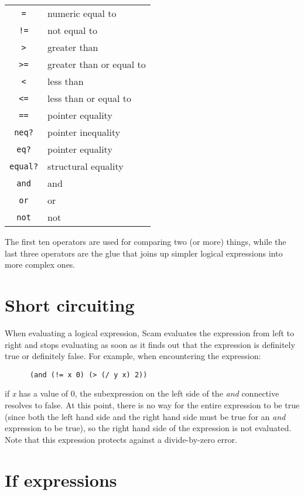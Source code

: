 \begin{tabular}{cl}%
    {\tt =}     & numeric equal to \\
    {\tt !=}    & not equal to \\
    {\tt >}     & greater than \\
    {\tt >=}    & greater than or equal to \\
    {\tt <}     & less than \\
    {\tt <=}    & less than or equal to \\
    {\tt ==}    & pointer equality \\
    {\tt neq?}  & pointer inequality \\
    {\tt eq?}   & pointer equality \\
    {\tt equal?}& structural equality \\
    {\tt and}   & and \\
    {\tt or}    & or \\
    {\tt not}   & not \\
\end{tabular}

The first ten operators are used for comparing two  (or more) things,
while the last three operators are the glue that joins up simpler
logical expressions into more complex ones.

\section{Short circuiting}

When evaluating a logical expression,
Scam evaluates the expression from left to right and
stops evaluating as soon as it finds out that the expression
is definitely true or definitely false.
For example, when encountering the expression:

\begin{verbatim}
      (and (!= x 0) (> (/ y x) 2))
\end{verbatim}

if {\it x} has a value of 0, the subexpression on the left side of the
{\it and}
connective resolves to false. At this point, there is no way for the
entire expression to be true (since both the left hand side and the right
hand side must be true for an
{\it and}
expression to be true), so the right
hand side of the expression is not evaluated. Note that this expression
protects against a divide-by-zero error.

\section{If expressions}

